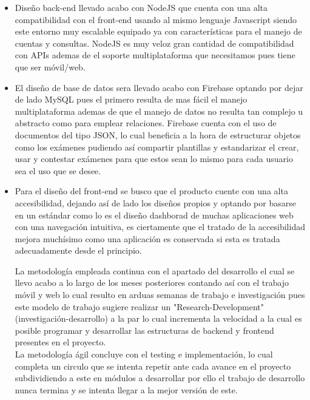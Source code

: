 \documentclass[12pt]{book}
\begin{document}
	\begin{itemize}
		\item Diseño back-end llevado acabo con NodeJS que cuenta con una alta compatibilidad con el front-end usando al mismo lenguaje Javascript siendo este entorno muy escalable equipado ya con características para el manejo de cuentas y consultas. NodeJS es muy veloz gran cantidad de compatibilidad con APIs ademas de el soporte multiplataforma que necesitamos pues tiene que ser móvil/web. 
		
		\item El diseño de base de datos sera llevado acabo con Firebase optando por dejar de lado MySQL pues el primero resulta de mas fácil el manejo multiplataforma ademas de que el manejo de datos no resulta tan complejo u abstracto como para emplear relaciones. Firebase cuenta con el uso de documentos del tipo JSON, lo cual beneficia a la hora de estructurar objetos como los exámenes pudiendo así compartir plantillas y estandarizar el crear, usar y contestar exámenes para que estos sean lo mismo para cada usuario sea el uso que se desee. 
		
		\item Para el diseño del front-end se busco que el producto cuente con una alta accesibilidad, dejando así de lado los diseños propios y optando por basarse en un estándar como lo es el diseño dashborad de muchas aplicaciones web con una navegación intuitiva, es ciertamente que el tratado de la accesibilidad mejora muchísimo como una aplicación es conservada si esta es tratada adecuadamente desde el principio. 
		
		La metodología empleada continua con el apartado del desarrollo el cual se llevo acabo a lo largo de los meses posteriores contando así con el trabajo móvil y web lo cual resulto en arduas semanas de trabajo e investigación pues este modelo de trabajo sugiere realizar un "Research-Development" (investigación-desarrollo) a la par lo cual incrementa la velocidad a la cual es posible programar y desarrollar las estructuras de backend y frontend presentes en el proyecto. \\
		La metodología ágil concluye con el testing e implementación, lo cual completa un circulo que se intenta repetir ante cada avance en el proyecto subdividiendo a este en módulos a desarrollar por ello el trabajo de desarrollo nunca termina y se intenta llegar a la mejor versión de este.
	\end{itemize}
\end{document}

